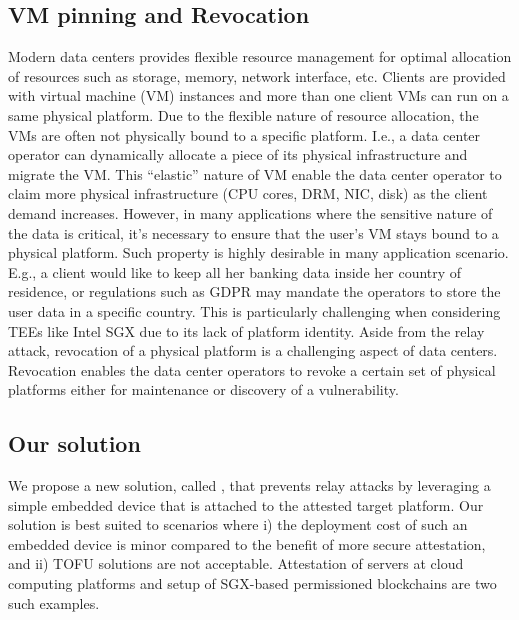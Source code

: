 \subsection{VM pinning and Revocation} 

Modern data centers provides flexible resource management for optimal allocation of resources such as storage, memory, network interface, etc. Clients are provided with virtual machine (VM) instances and more than one client VMs can run on a same physical platform. Due to the flexible nature of resource allocation, the VMs are often not physically bound to a specific platform. I.e., a data center operator can dynamically allocate a piece of its physical infrastructure and migrate the VM. This ``elastic'' nature of VM enable the data center operator to claim more physical infrastructure (CPU cores, DRM, NIC, disk) as the client demand increases. However, in many applications where the sensitive nature of the data is critical, it's necessary to ensure that the user's VM stays bound to a physical platform. Such property is highly desirable in many application scenario. E.g., a client would like to keep all her banking data inside her country of residence, or regulations such as GDPR may mandate the operators to store the user data in a specific country. This is particularly challenging when considering TEEs like Intel SGX due to its lack of platform identity. Aside from the relay attack, revocation of a physical platform is a challenging aspect of data centers. Revocation enables the data center operators to revoke a certain set of physical platforms either for maintenance or discovery of a vulnerability.

\subsection{Our solution} 

We propose a new solution, called \name, that prevents relay attacks by leveraging a simple embedded device that is attached to the attested target platform. Our solution is best suited to scenarios where i) the deployment cost of such an embedded device is minor compared to the benefit of more secure attestation, and ii) TOFU solutions are not acceptable. Attestation of servers at cloud computing platforms and setup of SGX-based permissioned blockchains are two such examples. 

